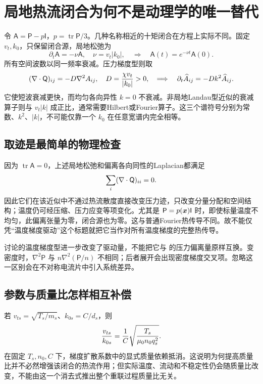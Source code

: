 \documentclass[UTF8,a4paper,11pt,openany,fontset=fandol]{ctexbook}
\begin{document}
\section{局地热流闭合为何不是动理学的唯一替代}
令 $\mathsf A=\mathsf P-p\mathsf I$，$p=\operatorname{tr}\mathsf P/3$。几种名称相近的十矩闭合在方程上实际不同。固定 $v_t,k_0$，只保留闭合源，局地松弛为
\begin{equation}
\partial_t\mathsf A=-\nu\mathsf A,\quad \nu=v_t|k_0|,
\quad\Longrightarrow\quad\mathsf A(t)=e^{-\nu t}\mathsf A(0).
\end{equation}
所有空间波数以同一频率衰减。压力梯度型则取
\begin{equation}
(\nabla\cdot\mathsf Q)_{ij}=-D\nabla^2 A_{ij},\quad
D={\chi v_t\over |k_0|}>0,
\quad\Longrightarrow\quad
\partial_t\widehat A_{ij}=-Dk^2\widehat A_{ij}.
\end{equation}
它使短波衰减更快，而均匀各向异性 $k=0$ 不衰减。非局地Landau型近似的衰减算子则与 $v_t|k|$ 成正比，通常需要Hilbert或Fourier算子。这三个谱符号分别为常数、$k^2$、$|k|$，不可能仅靠一个 $k_0$ 在任意宽谱内完全相等。\citep{Wang2015,Ng2017,L256,E552}

\subsection{取迹是最简单的物理检查}
因为 $\operatorname{tr}\mathsf A=0$，上述局地松弛和偏离各向同性的Laplacian都满足
\begin{equation}\sum_i(\nabla\cdot\mathsf Q)_{ii}=0.
\end{equation}
因此它们在该近似中不通过热流散度直接改变压力迹，只改变分量分配和空间结构；温度仍可经压缩、压力应变等项变化。尤其是 $\mathsf P=p(\bm{x})\mathsf I$ 时，即使标量温度不均匀，此偏离张量为零，闭合源也为零。这与普通Fourier热传导不同。故不能仅凭“温度梯度驱动”这个标题就把它当作对所有温度梯度的完整热传导。

\citet{Ng2020}讨论的温度梯度型进一步改变了驱动量，不能把它与 \citet{L256,E552} 的压力偏离量原样互换。变密度时，$\nabla^2\mathsf P$ 与 $n\nabla^2(\mathsf P/n)$ 不相同；后者展开会出现密度梯度交叉项。忽略这一区别会在不对称电流片中引入系统差异。

\subsection{参数与质量比怎样相互补偿}
若 $v_{ts}=\sqrt{T_s/m_s}$、$k_{0s}=C/d_s$，则
\begin{equation}
{v_{ts}\over k_{0s}}={1\over C}\sqrt{T_s\over\mu_0n_0q_s^2}.
\end{equation}
在固定 $T_s,n_0,C$ 下，梯度扩散系数中的显式质量依赖抵消。这说明为何提高质量比并不必然增强该闭合的热流作用；但实际温度、流动和不稳定性仍会随质量比改变，不能由这一个消去式推出整个重联过程质量比无关。
\end{document}
